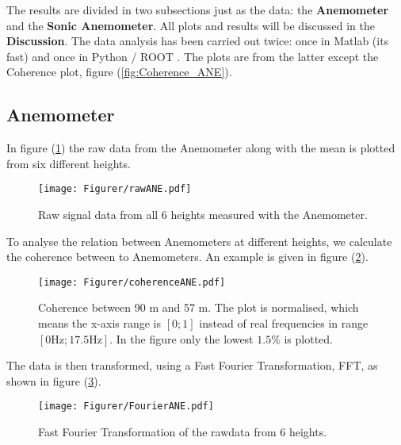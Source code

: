 The results are divided in two subsections just as the data: the \textbf{Anemometer} and the \textbf{Sonic Anemometer}.
All plots and results will be discussed in the \textbf{Discussion}. The data analysis has been carried out twice: 
once in Matlab \cite{matlab} (its fast) and once in Python \cite{python}/ ROOT \cite{root}. 
The plots are from the latter except the Coherence plot, figure (\ref{fig:Coherence_ANE}).


\subsection{Anemometer}
In figure (\ref{fig:raw_ANE}) the raw data from the Anemometer along with the mean is plotted from six different heights. 

\begin{figure}
\centering
\texttt{[image: Figurer/rawANE.pdf]}
\caption{Raw signal data from all 6 heights measured with the Anemometer.}
\label{fig:raw_ANE}
\end{figure}


To analyse the relation between Anemometers at different heights, we calculate the coherence between to Anemometers. An example is given in figure (\ref{fig:coherence_ANE}).

\begin{figure}
\centering
\texttt{[image: Figurer/coherenceANE.pdf]}
\caption{Coherence between 90 m and 57 m. The plot is normalised, which means the x-axis range is $[0 ; 1]$ instead of real frequencies in range $[0 \textrm{Hz} ; 17.5 \textrm{Hz}]$. In the figure only the lowest $1.5\%$ is plotted.}
\label{fig:coherence_ANE}
\end{figure}
 




The data is then transformed, using a Fast Fourier Transformation, FFT, as shown in figure (\ref{fig:Fourier_ANE}).

\begin{figure}
\centering
\texttt{[image: Figurer/FourierANE.pdf]}
\caption{Fast Fourier Transformation of the rawdata from 6 heights.}
\label{fig:Fourier_ANE}
\end{figure}


